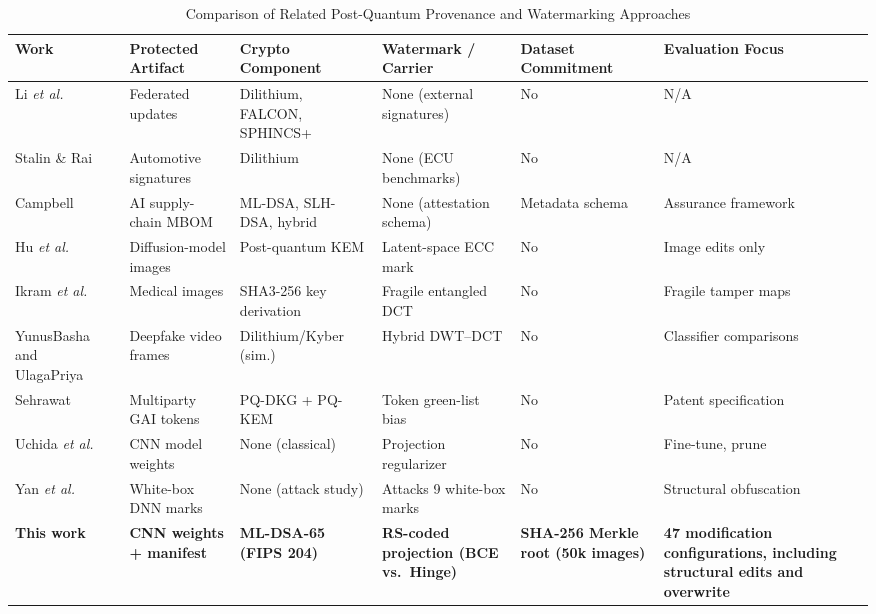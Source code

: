 \begin{table}[!t]
\centering
\caption{Comparison of Related Post-Quantum Provenance and Watermarking Approaches}
\label{tab:related-work}
\scriptsize
\begin{tabular}{@{}
  >{\raggedright\arraybackslash}p{2.3cm} >{\raggedright\arraybackslash}p{2.4cm}
  >{\raggedright\arraybackslash}p{2.3cm} >{\raggedright\arraybackslash}p{2.6cm}
  >{\raggedright\arraybackslash}p{2.3cm} >{\raggedright\arraybackslash}p{2.5cm}@{}}
\toprule
\textbf{Work} & \textbf{Protected Artifact} & \textbf{Crypto Component} & \textbf{Watermark / Carrier} & \textbf{Dataset Commitment} & \textbf{Evaluation Focus} \\
\midrule
Li \emph{et al.}~\cite{li2024federated} & Federated updates & Dilithium, FALCON, SPHINCS+ & None (external signatures) & No & N/A \\
Stalin \& Rai~\cite{stalin2025automotive} & Automotive signatures & Dilithium & None (ECU benchmarks) & No & N/A \\
Campbell~\cite{campbell2026mbom} & AI supply-chain MBOM & ML-DSA, SLH-DSA, hybrid & None (attestation schema) & Metadata schema & Assurance framework \\
Hu \emph{et al.}~\cite{hu2026diffusion} & Diffusion-model images & Post-quantum KEM & Latent-space ECC mark & No & Image edits only \\
Ikram \emph{et al.}~\cite{ikram2026medical} & Medical images & SHA3-256 key derivation & Fragile entangled DCT & No & Fragile tamper maps \\
YunusBasha and UlagaPriya~\cite{yunusbasha2026deepfake} & Deepfake video frames & Dilithium/Kyber (sim.) & Hybrid DWT--DCT & No & Classifier comparisons \\
Sehrawat~\cite{sehrawat2026patent} & Multiparty GAI tokens & PQ-DKG + PQ-KEM & Token green-list bias & No & Patent specification \\
Uchida \emph{et al.}~\cite{uchida2017embedding} & CNN model weights & None (classical) & Projection regularizer & No & Fine-tune, prune \\
Yan \emph{et al.}~\cite{yan2023rethinking} & White-box DNN marks & None (attack study) & Attacks 9 white-box marks & No & Structural obfuscation \\
\textbf{This work} & \textbf{CNN weights + manifest} & \textbf{ML-DSA-65 (FIPS 204)} & \textbf{RS-coded projection (BCE vs.\ Hinge)} & \textbf{SHA-256 Merkle root (50k images)} & \textbf{47 modification configurations, including structural edits and overwrite} \\
\bottomrule
\end{tabular}
\end{table}

